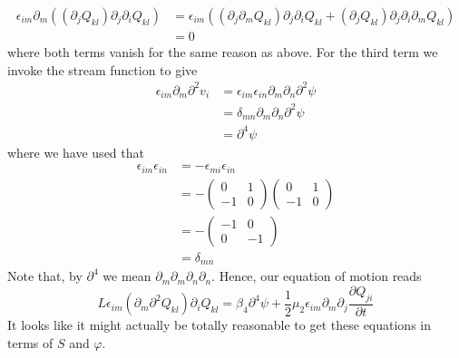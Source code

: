 \documentclass[reqno]{article}
\begin{document}
	\begin{equation}
	\begin{split}
		\epsilon_{im}\partial_m\left( \left( \partial_j Q_{kl} \right) \partial_j \partial_i Q_{kl} \right) &= \epsilon_{im} \left( \left( \partial_j\partial_m Q_{kl} \right)\partial_j\partial_i Q_{kl} + \left( \partial_j Q_{kl} \right) \partial_j\partial_i\partial_m Q_{kl} \right) \\
		&= 0
	\end{split}
	\end{equation}
	where both terms vanish for the same reason as above. For the third term we invoke the stream function to give
	\begin{equation}
	\begin{split}
		\epsilon_{im}\partial_m\partial^2 v_i &= \epsilon_{im}\epsilon_{in} \partial_m\partial_n \partial^2 \psi \\
		&= \delta_{mn} \partial_m \partial_n \partial^2 \psi \\
		&= \partial^4 \psi
	\end{split}
	\end{equation}
	where we have used that
	\begin{equation}
	\begin{split}
		\epsilon_{im}\epsilon_{in} &= -\epsilon_{mi}\epsilon_{in} \\
		&= -\begin{pmatrix} 0 & 1 \\ -1 & 0 \end{pmatrix} \begin{pmatrix} 0 & 1 \\ -1 & 0 \end{pmatrix} \\
		&= -\begin{pmatrix} -1 & 0 \\ 0 & -1 \end{pmatrix} \\
		&= \delta_{mn}
	\end{split}
	\end{equation}
	Note that, by $\partial^4$ we mean $\partial_m\partial_m \partial_n\partial_n$. Hence, our equation of motion reads
	\begin{equation} \label{eq:biharmonic}
		L\epsilon_{im}\left( \partial_m \partial^2 Q_{kl} \right)\partial_i Q_{kl} = \beta_4 \partial^4 \psi + \frac{1}{2} \mu_2 \epsilon_{im} \partial_m \partial_j \frac{\partial Q_{ji}}{\partial t}
	\end{equation}
	It looks like it might actually be totally reasonable to get these equations in terms of $S$ and $\varphi$. 
	
\end{document}

